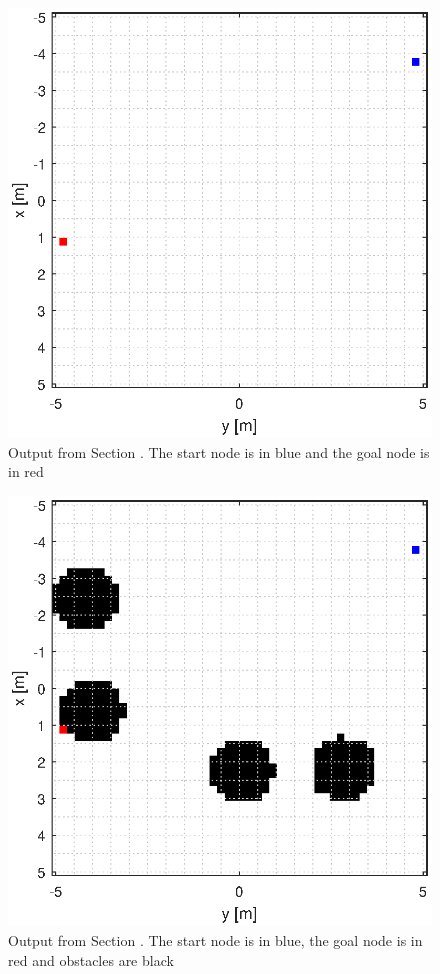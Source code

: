 \documentclass[Space3_Assign3.tex]{subfile}
\begin{document}
\begin{figure}[h]
\centering
\caption{Output from Section . The start node is in blue and the goal node is in red}
\label{Fig:gengrid}
\includegraphics[width = 0.7\linewidth]{generategrid.eps}
\end{figure}

\begin{figure}[h]
\centering
\caption{Output from Section . The start node is in blue, the goal node is in red and obstacles are black}
\label{Fig:genobs}
\includegraphics[width = 0.7\linewidth]{generateobstacles.eps}
\end{figure}
\end{document}

